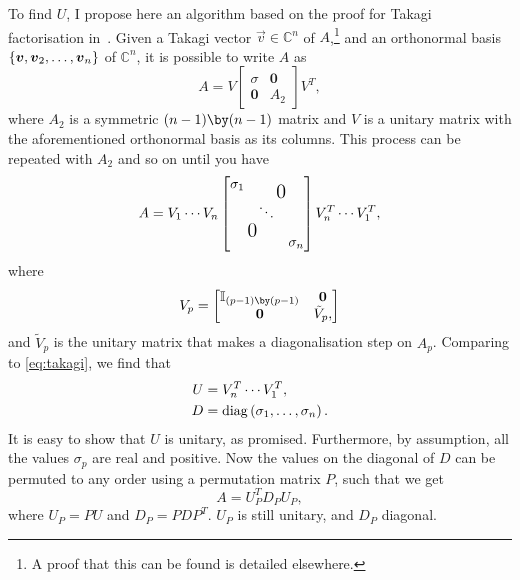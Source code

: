 \documentclass[english, notitlepage]{article}
\begin{document}
        To find \(U\), I propose here an algorithm based on the proof for Takagi factorisation in~\autocite{Horn}.
        Given a Takagi vector \(\vec{v} \in \mathbb{C}^n\) of \(A\),\footnote{A proof that this can be found is detailed elsewhere.} and an orthonormal basis \(\left\{\boldsymbol{v}, \boldsymbol{v}_2, \ldots, \boldsymbol{v}_n\right\}\) of \(\mathbb{C}^n\), it is possible to write \(A\) as
        \[
            A = V \begin{bmatrix}
                \sigma         & \boldsymbol{0} \\
                \boldsymbol{0} & A_2
            \end{bmatrix} V^T,
        \]
        where \(A_2\) is a symmetric \((n-1) \by (n-1)\) matrix and \(V\) is a unitary matrix with the aforementioned orthonormal basis as its columns.
        This process can be repeated with \(A_2\) and so on until you have
        \[
            A = V_1 \cdots V_{n} \begin{bmatrix}
                \sigma_1                                            & \multicolumn{2}{c}{\raisebox{-7pt}{\mbox{\Large 0}}}   \\
                                                                    & \ddots                                               & \\
                \multicolumn{2}{c}{\raisebox{7pt}{\mbox{\Large 0}}} & \sigma_n
            \end{bmatrix} V_{n}^T \cdots V_{1}^T,
        \]
        where
        \[
            V_p = \begin{bmatrix}
                \mathbb{I}_{(p-1) \by (p-1)} & \boldsymbol{0} \\
                \boldsymbol{0}               & \tilde{V}_p,
            \end{bmatrix}
        \]
        and \(\tilde{V}_p\) is the unitary matrix that makes a diagonalisation step on \(A_p\).
        Comparing to \cref{eq:takagi}, we find that
        \begin{subequations}
            \begin{align}
                U & = V_{n}^T \cdots V_{1}^T,                                  \\
                D & = \operatorname{diag}\left(\sigma_1, \ldots, \sigma_n\right).
            \end{align}
        \end{subequations}
        It is easy to show that \(U\) is unitary, as promised.
        Furthermore, by assumption, all the values \(\sigma_p\) are real and positive.
        Now the values on the diagonal of \(D\) can be permuted to any order using a permutation matrix \(P\), such that we get
        \[
            A = U_P^T D_P U_P,
        \]
        where \(U_P = P U\) and \(D_P = P D P^T\).
        \(U_P\) is still unitary, and \(D_P\) diagonal.
\end{document}
